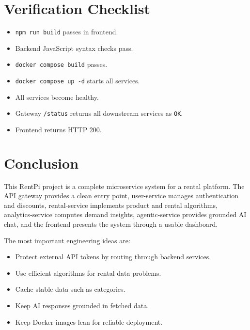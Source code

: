 \documentclass[11pt,a4paper]{article}
\begin{document}
\section{Verification Checklist}

\begin{itemize}
  \item \texttt{npm run build} passes in frontend.
  \item Backend JavaScript syntax checks pass.
  \item \texttt{docker compose build} passes.
  \item \texttt{docker compose up -d} starts all services.
  \item All services become healthy.
  \item Gateway \texttt{/status} returns all downstream services as \texttt{OK}.
  \item Frontend returns HTTP 200.
\end{itemize}

\section{Conclusion}

This RentPi project is a complete microservice system for a rental platform. The API gateway provides a clean entry point, user-service manages authentication and discounts, rental-service implements product and rental algorithms, analytics-service computes demand insights, agentic-service provides grounded AI chat, and the frontend presents the system through a usable dashboard.

The most important engineering ideas are:

\begin{itemize}
  \item Protect external API tokens by routing through backend services.
  \item Use efficient algorithms for rental data problems.
  \item Cache stable data such as categories.
  \item Keep AI responses grounded in fetched data.
  \item Keep Docker images lean for reliable deployment.
\end{itemize}
\end{document}
